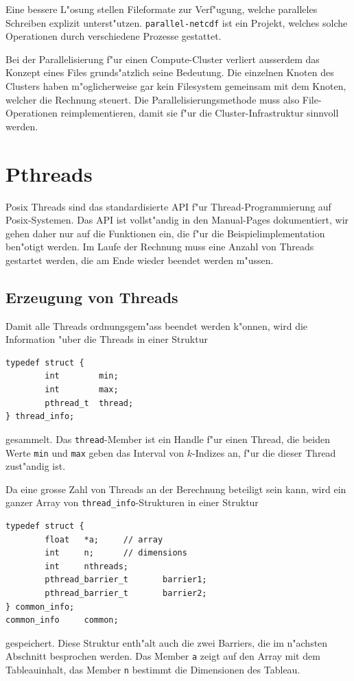 Eine bessere L"osung stellen Fileformate zur Verf"ugung, welche paralleles
Schreiben explizit unterst"utzen. {\tt parallel-netcdf} ist ein Projekt,
welches solche Operationen durch verschiedene Prozesse gestattet.

Bei der Parallelisierung f"ur einen Compute-Cluster verliert ausserdem
das Konzept eines Files grunds"atzlich seine Bedeutung.
Die einzelnen Knoten des Clusters haben m"oglicherweise gar kein Filesystem
gemeinsam mit dem Knoten, welcher die Rechnung steuert. 
Die Parallelisierungsmethode muss also File-Operationen reimplementieren,
damit sie f"ur die Cluster-Infrastruktur sinnvoll werden.

\section{Pthreads}
Posix Threads sind das standardisierte API f"ur Thread-Programmierung
auf Posix-Systemen.
Das API ist vollst"andig in den Manual-Pages dokumentiert, wir gehen
daher nur auf die Funktionen ein, die f"ur die Beispielimplementation
ben"otigt werden. Im Laufe der Rechnung muss eine Anzahl von Threads
gestartet werden, die am Ende wieder beendet werden m"ussen.

\subsection{Erzeugung von Threads}
Damit alle Threads ordnungsgem"ass beendet werden k"onnen, wird die Information
"uber die Threads in einer Struktur
\begin{verbatim}
typedef struct {
        int        min;
        int        max;
        pthread_t  thread;
} thread_info;
\end{verbatim}
gesammelt. Das {\tt thread}-Member ist ein Handle f"ur einen Thread, die
beiden Werte {\tt min} und {\tt max} geben das Interval von $k$-Indizes
an, f"ur die dieser Thread zust"andig ist.

Da eine grosse Zahl von Threads an der Berechnung beteiligt sein kann,
wird ein ganzer Array von \verb+thread_info+-Strukturen in einer
Struktur
\begin{verbatim}
typedef struct {
        float   *a;     // array
        int     n;      // dimensions
        int     nthreads;
        pthread_barrier_t       barrier1;
        pthread_barrier_t       barrier2;
} common_info;
common_info     common;
\end{verbatim}
gespeichert. Diese Struktur enth"alt auch die zwei Barriers, die
im n"achsten Abschnitt besprochen werden. Das Member {\tt a}
zeigt auf den Array mit dem Tableauinhalt, das Member {\tt n} 
bestimmt die Dimensionen des Tableau.

